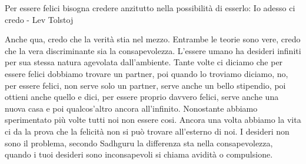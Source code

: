 \documentclass[12pt]{book} %
\begin{document}
Per essere felici bisogna credere anzitutto nella possibilità di esserlo: Io adesso ci credo - Lev Tolstoj 

Anche qua, credo che la verità stia nel mezzo. Entrambe le teorie sono vere, credo che la vera discriminante sia la
consapevolezza. L'essere umano ha desideri infiniti per sua stessa natura agevolata
dall'ambiente. Tante volte ci diciamo che per essere felici dobbiamo trovare un partner, poi
quando lo troviamo diciamo, no, per essere felici, non serve solo un partner, serve anche un bello stipendio, poi
ottieni anche quello e dici, per essere proprio davvero felici, serve anche una nuova casa e poi
qualcos'altro ancora all'infinito. Nonostante abbiamo sperimentato più
volte tutti noi non essere cosi. Ancora una volta abbiamo la vita ci da la prova che la felicità non si può trovare
all'esterno di noi. I desideri non sono il problema, secondo Sadhguru la differenza sta nella consapevolezza, quando i tuoi
desideri sono inconsapevoli si chiama avidità o compulsione. 
\end{document}

